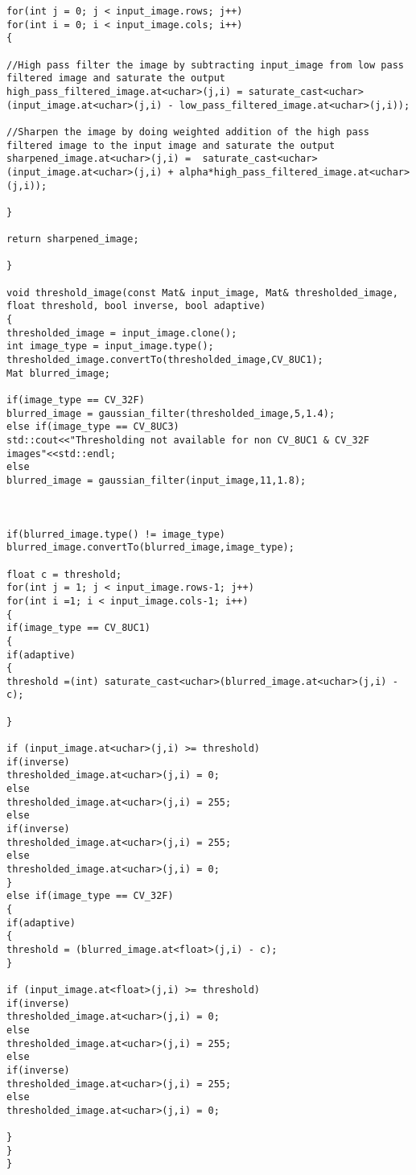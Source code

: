 \begin{lstlisting}
for(int j = 0; j < input_image.rows; j++)
for(int i = 0; i < input_image.cols; i++)
{

//High pass filter the image by subtracting input_image from low pass filtered image and saturate the output
high_pass_filtered_image.at<uchar>(j,i) = saturate_cast<uchar>(input_image.at<uchar>(j,i) - low_pass_filtered_image.at<uchar>(j,i));

//Sharpen the image by doing weighted addition of the high pass filtered image to the input image and saturate the output
sharpened_image.at<uchar>(j,i) =  saturate_cast<uchar>(input_image.at<uchar>(j,i) + alpha*high_pass_filtered_image.at<uchar>(j,i));

}

return sharpened_image;

}

void threshold_image(const Mat& input_image, Mat& thresholded_image, float threshold, bool inverse, bool adaptive)
{
thresholded_image = input_image.clone();
int image_type = input_image.type();
thresholded_image.convertTo(thresholded_image,CV_8UC1);
Mat blurred_image;

if(image_type == CV_32F)
blurred_image = gaussian_filter(thresholded_image,5,1.4);
else if(image_type == CV_8UC3)
std::cout<<"Thresholding not available for non CV_8UC1 & CV_32F images"<<std::endl;
else
blurred_image = gaussian_filter(input_image,11,1.8);



if(blurred_image.type() != image_type)
blurred_image.convertTo(blurred_image,image_type);

float c = threshold;
for(int j = 1; j < input_image.rows-1; j++)
for(int i =1; i < input_image.cols-1; i++)
{
if(image_type == CV_8UC1)
{
if(adaptive)
{
threshold =(int) saturate_cast<uchar>(blurred_image.at<uchar>(j,i) - c);

}

if (input_image.at<uchar>(j,i) >= threshold)
if(inverse)
thresholded_image.at<uchar>(j,i) = 0;
else
thresholded_image.at<uchar>(j,i) = 255;
else
if(inverse)
thresholded_image.at<uchar>(j,i) = 255;
else
thresholded_image.at<uchar>(j,i) = 0;
}
else if(image_type == CV_32F)
{
if(adaptive)
{
threshold = (blurred_image.at<float>(j,i) - c);
}

if (input_image.at<float>(j,i) >= threshold)
if(inverse)
thresholded_image.at<uchar>(j,i) = 0;
else
thresholded_image.at<uchar>(j,i) = 255;
else
if(inverse)
thresholded_image.at<uchar>(j,i) = 255;
else
thresholded_image.at<uchar>(j,i) = 0;

}
}
}
\end{lstlisting}

